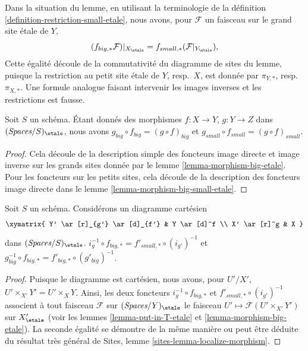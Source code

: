 \noindent
Dans la situation du lemme, en utilisant la terminologie de
la définition \ref{definition-restriction-small-etale},
nous avons, pour $\mathcal{F}$ un faisceau sur le grand site \'etale de $Y$,
$$
(f_{big, *}\mathcal{F})|_{X_\etale} =
f_{small, *}(\mathcal{F}|_{Y_\etale}),
$$
Cette égalité découle de la commutativité du diagramme de
sites du lemme, puisque la restriction au petit site \'etale de
$Y$, resp.\ $X$, est donnée par $\pi_{Y, *}$, resp.\ $\pi_{X, *}$.
Une formule analogue faisant intervenir les images inverses et les restrictions est fausse.

\begin{lemma}
\label{lemma-composition-etale}
Soit $S$ un schéma. Étant donnés des morphismes $f : X \to Y$, $g : Y \to Z$
dans $(\textit{Spaces}/S)_\etale$, nous avons
$g_{big} \circ f_{big} = (g \circ f)_{big}$ et
$g_{small} \circ f_{small} = (g \circ f)_{small}$.
\end{lemma}

\begin{proof}
Cela découle de la description simple des foncteurs image directe
et image inverse sur les grands sites donnée par le
lemme \ref{lemma-morphism-big-etale}. Pour les foncteurs
sur les petits sites, cela découle de la description des
foncteurs image directe dans le lemme \ref{lemma-morphism-big-small-etale}.
\end{proof}

\begin{lemma}
\label{lemma-morphism-big-small-cartesian-diagram-etale}
Soit $S$ un schéma. Considérons un diagramme cartésien
$$
\xymatrix{
Y' \ar[r]_{g'} \ar[d]_{f'} & Y \ar[d]^f \\
X' \ar[r]^g & X
}
$$
dans $(\textit{Spaces}/S)_\etale$.
$i_g^{-1} \circ f_{big, *} = f'_{small, *} \circ (i_{g'})^{-1}$
et $g_{big}^{-1} \circ f_{big, *} = f'_{big, *} \circ (g'_{big})^{-1}$.
\end{lemma}

\begin{proof}
Puisque le diagramme est cartésien, nous avons, pour $U'/X'$,
$U' \times_{X'} Y' = U' \times_X Y$. Ainsi, les deux foncteurs
$i_g^{-1} \circ f_{big, *}$ et $f'_{small, *} \circ (i_{g'})^{-1}$
associent à tout faisceau $\mathcal{F}$ sur $(\textit{Spaces}/Y)_\etale$ le faisceau
$U' \mapsto \mathcal{F}(U' \times_{X'} Y')$ sur $X'_\etale$
(voir les lemmes \ref{lemma-put-in-T-etale} et \ref{lemma-morphism-big-etale}).
La seconde égalité se démontre de la même manière ou peut être
déduite du résultat très général de
Sites, lemme \ref{sites-lemma-localize-morphism}.
\end{proof}

